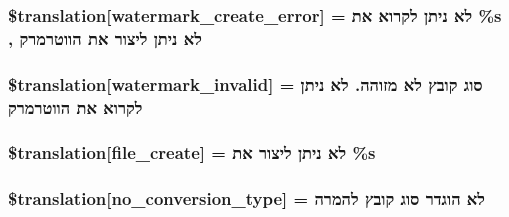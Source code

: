 \subsubsection[{\$translation}]{\setlength{\rightskip}{0pt plus 5cm}\$translation\mbox{[}\textquotesingle{}watermark\+\_\+create\+\_\+error\textquotesingle{}\mbox{]} = \textquotesingle{}לא ניתן לקרוא את \%s , לא ניתן ליצור את הווטרמרק\textquotesingle{}}\label{class_8upload_8he___i_l_8php_aabca0b65dadbc6184415c16375f284ca}
\hypertarget{class_8upload_8he___i_l_8php_ac336e7a5701e47ba4a05e9e498a3cc44}{}
\subsubsection[{\$translation}]{\setlength{\rightskip}{0pt plus 5cm}\$translation\mbox{[}\textquotesingle{}watermark\+\_\+invalid\textquotesingle{}\mbox{]} = \textquotesingle{}סוג קובץ לא מזוהה. לא ניתן לקרוא את הווטרמרק\textquotesingle{}}\label{class_8upload_8he___i_l_8php_ac336e7a5701e47ba4a05e9e498a3cc44}
\hypertarget{class_8upload_8he___i_l_8php_a1ecb4673e4fb69e06b3f20b65cecf30a}{}
\subsubsection[{\$translation}]{\setlength{\rightskip}{0pt plus 5cm}\$translation\mbox{[}\textquotesingle{}file\+\_\+create\textquotesingle{}\mbox{]} = \textquotesingle{}לא ניתן ליצור את \%s \textquotesingle{}}\label{class_8upload_8he___i_l_8php_a1ecb4673e4fb69e06b3f20b65cecf30a}
\hypertarget{class_8upload_8he___i_l_8php_a4712d7ec28e9a7f17eb3338af2358363}{}
\subsubsection[{\$translation}]{\setlength{\rightskip}{0pt plus 5cm}\$translation\mbox{[}\textquotesingle{}no\+\_\+conversion\+\_\+type\textquotesingle{}\mbox{]} = \textquotesingle{}לא הוגדר סוג קובץ להמרה\textquotesingle{}}\label{class_8upload_8he___i_l_8php_a4712d7ec28e9a7f17eb3338af2358363}
\hypertarget{class_8upload_8he___i_l_8php_a783c9358bcf54a054545b50098bc679b}{}
